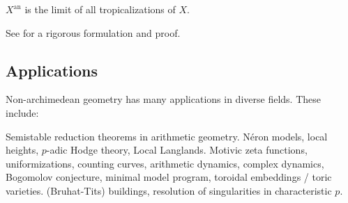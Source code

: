\begin{theorem}
$X^\mathrm{an}$ is the limit of all tropicalizations of $X$. 
\end{theorem}

See \cite{payne-2009} for a rigorous formulation and proof. 





\subsection{Applications}

Non-archimedean geometry has many applications in diverse fields. These 
include: 

Semistable reduction theorems in arithmetic geometry. N\'eron models, 
local heights, $p$-adic Hodge theory, Local Langlands. Motivic zeta 
functions, uniformizations, counting curves, arithmetic dynamics, 
complex dynamics, Bogomolov conjecture, minimal model program, 
toroidal embeddings / toric varieties. (Bruhat-Tits) buildings, resolution 
of singularities in characteristic $p$. 




